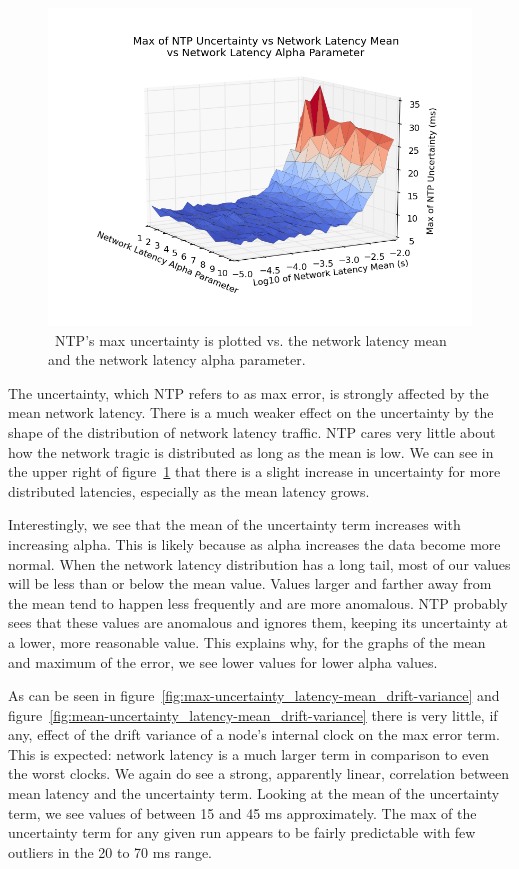 \begin{figure}[!htbp]
  \caption{~NTP's max uncertainty is plotted vs. the network latency mean and the network latency alpha parameter.}
  \label{fig:max-uncertainty_latency-mean_latency-alpha}
  \includegraphics[width=0.8\linewidth]{max_error-latency_mean-latency_alpha.png}
\end{figure}

The uncertainty, which NTP refers to as max error, 
is strongly affected by the mean network
latency. There is a much weaker effect on the uncertainty by the shape
of the distribution of network latency traffic. NTP cares very little
about how the network tragic is distributed as long as the mean is
low. We can see in the upper right of figure~\ref{fig:max-uncertainty_latency-mean_latency-alpha} that there is a slight increase in uncertainty for more
distributed latencies, especially as the mean latency grows.

Interestingly, we see that the mean of the uncertainty term increases
with increasing alpha. This is likely because as alpha increases the
data become more normal. When the network latency distribution has a
long tail, most of our values will be less than or below the mean
value. Values larger and farther away from the mean tend to happen
less frequently and are more anomalous. NTP probably sees that these
values are anomalous and ignores them, keeping its uncertainty at a
lower, more reasonable value. This explains why, for the graphs of the
mean and maximum of the error, we see lower values for lower alpha
values.

As can be seen in figure~\ref{fig:max-uncertainty_latency-mean_drift-variance} and 
figure~\ref{fig:mean-uncertainty_latency-mean_drift-variance} there is very little, if any,
effect of the drift variance of a node's internal clock on the max
error term. This is expected: network latency is a much larger term in
comparison to even the worst clocks. We again do see a strong,
apparently linear, correlation between mean latency and the uncertainty
term. Looking at the mean of the uncertainty term, we see values of
between 15 and 45 ms approximately. The max of the uncertainty term for
any given run appears to be fairly predictable with few outliers in
the 20 to 70 ms range. 

